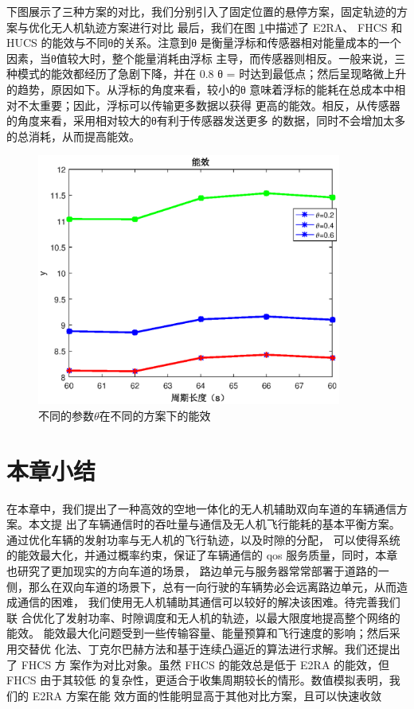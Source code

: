 下图展示了三种方案的对比，我们分别引入了固定位置的悬停方案，固定轨迹的方案与优化无人机轨迹方案进行对比
最后，我们在图 \ref{不同的参数在不同的方案下的能效}中描述了 E2RA、 FHCS 和 HUCS 的能效与不同θ的关系。注意到θ
是衡量浮标和传感器相对能量成本的一个因素，当θ值较大时，整个能量消耗由浮标
主导，而传感器则相反。一般来说，三种模式的能效都经历了急剧下降，并在 0.8 θ =
时达到最低点；然后呈现略微上升的趋势，原因如下。从浮标的角度来看，较小的θ
意味着浮标的能耗在总成本中相对不太重要；因此，浮标可以传输更多数据以获得
更高的能效。相反，从传感器的角度来看，采用相对较大的θ有利于传感器发送更多
的数据，同时不会增加太多的总消耗，从而提高能效。
\begin{figure}[H]
\centering
\includegraphics[width=10cm]{figures//chap4//untitled.eps}
\caption{不同的参数$\theta$在不同的方案下的能效}
\label{不同的参数在不同的方案下的能效}
\end{figure}
\section{本章小结}\label{section4-6}

在本章中，我们提出了一种高效的空地一体化的无人机辅助双向车道的车辆通信方案。本文提
出了车辆通信时的吞吐量与通信及无人机飞行能耗的基本平衡方案。通过优化车辆的发射功率与无人机的飞行轨迹，以及时隙的分配，
可以使得系统的能效最大化，并通过概率约束，保证了车辆通信的 qos 服务质量，同时，本章也研究了更加现实的方向车道的场景，
路边单元与服务器常常部署于道路的一侧，那么在双向车道的场景下，总有一向行驶的车辆势必会远离路边单元，从而造成通信的困难，
我们使用无人机辅助其通信可以较好的解决该困难。\textcolor[RGB]{18,220,168}{待完善我们联
合优化了发射功率、时隙调度和无人机的轨迹，以最大限度地提高整个网络的能效。
能效最大化问题受到一些传输容量、能量预算和飞行速度的影响；然后采用交替优
化法、丁克尔巴赫方法和基于连续凸逼近的算法进行求解。我们还提出了 FHCS 方
案作为对比对象。虽然 FHCS 的能效总是低于 E2RA 的能效，但 FHCS 由于其较低
的复杂性，更适合于收集周期较长的情形。数值模拟表明，我们的 E2RA 方案在能
效方面的性能明显高于其他对比方案，且可以快速收敛}

